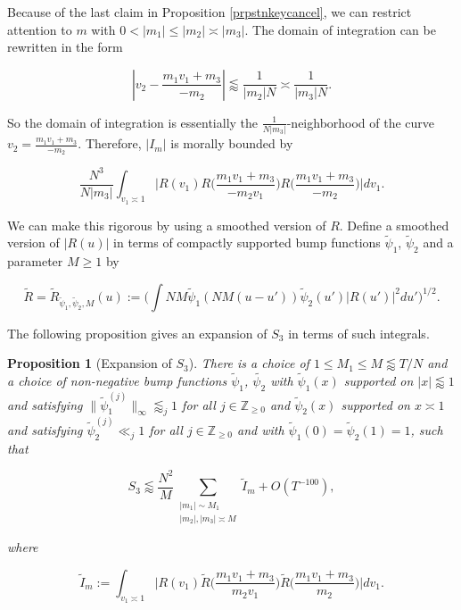 \documentclass{amsart}
\theoremstyle{plain}
\newtheorem{prpstn}[thrm]{Proposition}
\numberwithin{equation}{section}
\renewcommand{\tilde}{\widetilde}
\begin{document}
Because of the last claim in Proposition \ref{prpstnkeycancel},  we can restrict attention to $m$ with $0 < |m_1| \le |m_2| \asymp |m_3|$.   The domain of integration can be rewritten in the form

\[ \left| v_2 - \frac{m_1 v_1 + m_3}{-m_2} \right| \lessapprox \frac{1}{|m_2|N} \asymp \frac{1}{|m_3| N}. \]

So the domain of integration is essentially the $\frac{1}{N |m_3|}$-neighborhood of the curve $v_2 = \frac{m_1 v_1 + m_3}{-m_2}$.  Therefore,  $|I_m|$ is morally bounded by

$$\frac{N^3}{N |m_3|} \int_{v_1 \asymp 1} \Big| R ( v_1 ) R \Big( \frac{ m_1 v_1 + m_3}{-m_2 v_1} \Big) R \Big( \frac{m_1 v_1 + m_3}{-m_2} \Big) \Big| dv_1. $$

We can make this rigorous by using a smoothed version of $R$.  Define a smoothed version of $| R(u) |$ in terms of compactly supported bump functions $\tilde{\psi}_1$, $\tilde{\psi}_2$ and a parameter $M\ge 1$ by

\begin{equation} \label{eq:RtDef}
\tilde{R}=\tilde{R}_{\tilde{\psi}_1,\tilde{\psi}_2,M}(u) :=\Big(  \int NM \tilde{\psi}_1(N M (u - u')) \tilde{\psi}_2(u')|R(u')|^2 du' \Big)^{1/2}.
\end{equation}

The following proposition gives an expansion of $S_3$ in terms of such integrals.

%
%


\begin{prpstn}[Expansion of $S_3$]\label{prpstn:S3Expansion}
There is a choice of $1\le M_1\le M\lessapprox T/N$ and a choice of non-negative bump functions $\tilde{\psi}_1$, $\tilde{\psi_2}$ with $\tilde{\psi}_1(x)$ supported on $|x|\lessapprox 1$ and satisfying $\|\tilde{\psi}_1^{(j)}\|_\infty\lessapprox_j 1$ for all $j\in \mathbb{Z}_{\ge 0}$ and $\tilde{\psi}_2(x)$ supported on $x\asymp 1$ and satisfying $\tilde{\psi}_2^{(j)}\ll_j 1$ for all $j\in\mathbb{Z}_{\ge 0}$ and with $\tilde{\psi}_1(0)=\tilde{\psi}_2(1)=1$, such that

\[
S_3 \lessapprox \frac{N^2}{M} \sum_{\substack{|m_1| \sim M_1\\    |m_2|,  |m_3| \asymp M}}  \tilde{I}_m+O(T^{-100}),
\]

where

\[
\tilde{I}_m:= \int_{v_1 \asymp 1}  \Big| R ( v_1) \tilde{R} \Big( \frac{ m_1 v_1 + m_3}{m_2 v_1} \Big) \tilde{R} \Big( \frac{m_1 v_1 + m_3}{m_2} \Big) \Big| dv_1.  
\]
\end{prpstn}
\end{document}
